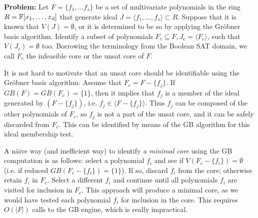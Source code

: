 \textbf{Problem: }
Let $F = \{f_1, \dots f_s\}$ be a set of multivariate polynomials in
the ring $R = {\mathbb{F}}[x_1,\dots,x_d]$ that generate ideal $J = \langle
f_1,\dots,f_s\rangle \subset R$. Suppose that it is known that $V(J) =
\emptyset$, or it is determined to be so by applying the Gr\"obner
basis algorithm. Identify a subset of polynomials $F_c \subseteq F,
J_c = \langle F_c \rangle$, such that $V(J_c) = \emptyset$
too. Borrowing the terminology from the Boolean SAT domain, we
call $F_c$ the infeasible core or the unsat core of $F$. 


It is not hard to motivate that an unsat core should be identifiable
using the Gr\"obner basis algorithm: Assume that $F_c=F-\{f_j\}$. If
$GB(F) = GB(F_c) = \{1\}$, then it implies that $f_j$ is a member of
the ideal generated by $(F - \{f_j\})$, i.e. $f_j \in \langle F -
\{f_j\}\rangle$. Thus $f_j$ can be composed of the other
polynomials of $F_c$, so $f_j$ is  not a part of the unsat core, and
it can be safely discarded from $F_c$. This can be identified by means
of the GB algorithm for this ideal membership test.%

A n\"aive way (and inefficient way) to identify {\it a minimal core}
using the GB computation is as follows:
select a polynomial $f_i$ and see if $V(F_c - \{f_i\}) = \emptyset$
(i.e. if reduced $GB(F_c - \{f_i\}) = \{1\}$). If so, discard $f_i$
from the core; otherwise retain $f_i$ in $F_c$. Select a different
$f_i$ and continue until all polynomials $f_i$ are visited for
inclusion in $F_c$. This approach will produce a minimal core, as we
would have tested each polynomial $f_i$ for inclusion in the
core. This requires $O(|F|)$ calls to the GB engine, which is really
impractical.   

